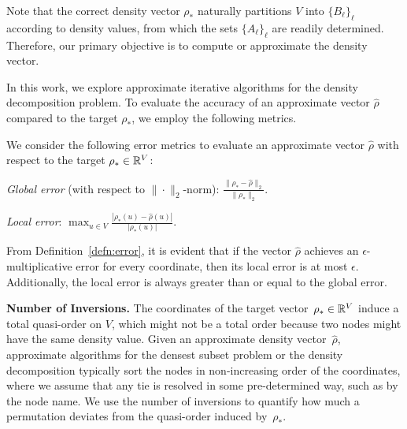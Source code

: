 Note that the correct density vector $\rho_*$ naturally partitions $V$ into $\{B_\ell\}_\ell$ according to density values, from which the sets $\{A_\ell\}_\ell$ are readily determined. Therefore, our primary objective is to compute or approximate the density vector.

In this work, we explore approximate iterative algorithms for the density decomposition problem. To evaluate the accuracy of an approximate vector $\widehat{\rho}$ compared to the target $\rho_*$, we employ the following metrics.



\begin{definition}
	\label{defn:error}
	We consider the following error metrics to evaluate an approximate vector $\widehat{\rho}$ with respect to the target $\rho_* \in \mathbb{R}^V$:

	\begin{compactitem}
		
		\item \emph{Global error} (with respect to $\| \cdot \|_2$-norm):
		$\frac{\|\rho_* - \widehat{\rho}\|_2}{\|\rho_*\|_2}$.
		
		
		\item \emph{Local error}:
				$\max_{u \in V} \frac{|\rho_*(u) - \widehat{\rho}(u)|}{|\rho_*(u)|}$.
		
	\end{compactitem}
\end{definition}

From Definition~\ref{defn:error},
it is evident that if the vector $\widehat{\rho}$ achieves an $\epsilon$-multiplicative error for every coordinate, then its local error is at most $\epsilon$. Additionally, the local error is always greater than or equal to the global error.


\noindent \textbf{Number of Inversions.} The coordinates of the target vector~$\rho_* \in \mathbb{R}^V$ induce a total quasi-order on $V$, which might not be a total order because
two nodes might have the same density value.  
Given an approximate density vector~$\widehat{\rho}$,
approximate algorithms for the densest subset problem
or the density decomposition typically sort the nodes in non-increasing order of the coordinates,
where we assume that any tie is resolved in some pre-determined way, such as by the node name.
We use the number of inversions to quantify how much a permutation deviates
from the quasi-order induced by~$\rho_*$.


